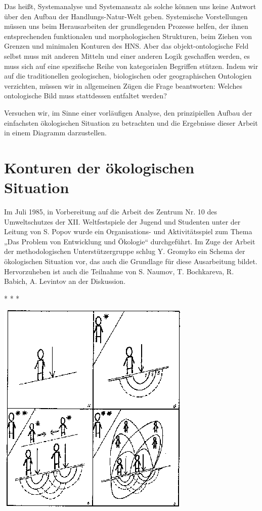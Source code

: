 \documentclass[11pt,a4paper]{article}
\begin{document}
Das heißt, Systemanalyse und Systemansatz als solche können uns keine Antwort
über den Aufbau der Handlungs-Natur-Welt geben. Systemische Vorstellungen
müssen uns beim Herausarbeiten der grundlegenden Prozesse helfen, der ihnen
entsprechenden funktionalen und morphologischen Strukturen, beim Ziehen von
Grenzen und minimalen Konturen des HNS. Aber das objekt-ontologische Feld
selbst muss mit anderen Mitteln und einer anderen Logik geschaffen werden, es
muss sich auf eine spezifische Reihe von kategorialen Begriffen stützen.
Indem wir auf die traditionellen geologischen, biologischen oder
geographischen Ontologien verzichten, müssen wir in allgemeinen Zügen die
Frage beantworten: Welches ontologische Bild muss stattdessen entfaltet
werden?

Versuchen wir, im Sinne einer vorläufigen Analyse, den prinzipiellen Aufbau
der einfachsten ökologischen Situation zu betrachten und die Ergebnisse dieser
Arbeit in einem Diagramm darzustellen.

\section{Konturen der ökologischen Situation}

Im Juli 1985, in Vorbereitung auf die Arbeit des Zentrum Nr. 10 des
Umweltschutzes der XII. Weltfestspiele der Jugend und Studenten unter der
Leitung von S. Popov wurde ein Organisations- und Aktivitätsspiel zum Thema
„Das Problem von Entwicklung und Ökologie“ durchgeführt. Im Zuge der Arbeit
der methodologischen Unterstützergruppe schlug Y. Gromyko ein Schema der
ökologischen Situation vor, das auch die Grundlage für diese Ausarbeitung
bildet. Hervorzuheben ist auch die Teilnahme von S. Naumov, T. Bochkareva,
R. Babich, A. Levintov an der Diskussion.

\begin{center}
  * * *

  \includegraphics[width=.5\textwidth]{activity-nature-system.png}
\end{center}
\end{document}
